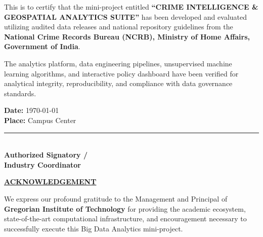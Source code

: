 \documentclass[12pt,a4paper]{report}
\begin{document}
\vspace{1.5cm}
\noindent This is to certify that the mini-project entitled \textbf{“CRIME INTELLIGENCE \& GEOSPATIAL ANALYTICS SUITE”} has been developed and evaluated utilizing audited data releases and national repository guidelines from the \textbf{National Crime Records Bureau (NCRB), Ministry of Home Affairs, Government of India}.

\vspace{1cm}
\noindent The analytics platform, data engineering pipelines, unsupervised machine learning algorithms, and interactive policy dashboard have been verified for analytical integrity, reproducibility, and compliance with data governance standards.

\vspace{3.5cm}
\noindent
\begin{minipage}{0.45\textwidth}
    \begin{flushleft}
        \textbf{Date:} \today\\[4pt]
        \textbf{Place:} Campus Center
    \end{flushleft}
\end{minipage}
\hfill
\begin{minipage}{0.45\textwidth}
    \begin{flushright}
        \rule{5cm}{0.5pt}\\[4pt]
        \textbf{Authorized Signatory /}\\[2pt]
        \textbf{Industry Coordinator}
    \end{flushright}
\end{minipage}
\newpage

\thispagestyle{frontmatterstyle}
\begin{center}
    \vspace*{0.5cm}
    {\fontsize{14}{18}\selectfont\bfseries\underline{ACKNOWLEDGEMENT}\par}
\end{center}
\vspace{1cm}

\noindent We express our profound gratitude to the Management and Principal of \textbf{Gregorian Institute of Technology} for providing the academic ecosystem, state-of-the-art computational infrastructure, and encouragement necessary to successfully execute this Big Data Analytics mini-project.
\end{document}
